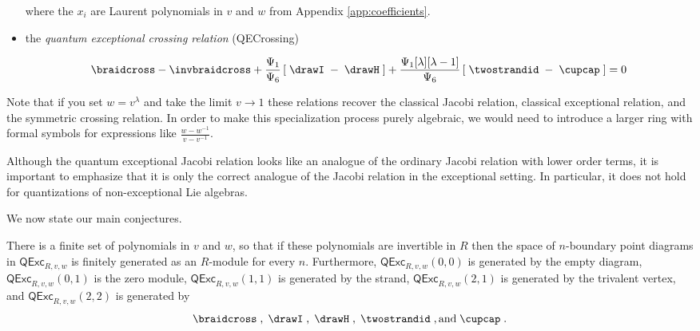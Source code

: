 \documentclass[12pt]{amsart}
\begin{document}
\begin{definition}
\begin{itemize}
where the $x_i$ are Laurent polynomials in $v$ and $w$ from Appendix \ref{app:coefficients}.

\item the \emph{quantum exceptional crossing relation} (QECrossing)

\begin{equation}
\label{eq:QECrossing-w}
\braidcross - \invbraidcross + \frac{\Psi_1}{\Psi_6} \left[\; \drawI \; - \; \drawH \; \right] + \frac{\Psi_1 [\lambda][\lambda-1]}{\Psi_6} \left[\; \twostrandid \; - \; \cupcap \; \right] = 0
\end{equation}


\end{itemize}
\end{definition}

Note that if you set $w = v^\lambda$ and take the limit $v \rightarrow 1$
these relations recover the classical Jacobi relation, classical exceptional
relation, and the symmetric crossing relation.  In order to make this
specialization process purely algebraic, we would need to introduce a larger
ring with formal symbols for expressions like $\frac{w-w^{-1}}{v-v^{-1}}$.

\begin{warning}
Although the quantum exceptional Jacobi relation looks like an
analogue of the ordinary Jacobi relation with lower order terms, it is
important to emphasize that it is only the correct analogue of the Jacobi
relation in the exceptional setting.  In particular, it does not hold for
quantizations of non-exceptional Lie algebras.
\end{warning}

We now state our main conjectures.

\begin{conjecture}
  \label{conj:quant-suffic}
There is a finite set of polynomials in $v$ and $w$, so that if these
polynomials are invertible in $R$ then the space of $n$-boundary point
diagrams in $\mathsf{QExc}_{R,v,w}$ is finitely generated as an $R$-module for
every $n$.  Furthermore, $\mathsf{QExc}_{R,v,w}(0,0)$ is generated by the
empty diagram, $\mathsf{QExc}_{R,v,w}(0,1)$ is the zero module,
$\mathsf{QExc}_{R,v,w}(1,1)$ is generated by the strand,
$\mathsf{QExc}_{R,v,w}(2,1)$ is generated by the trivalent vertex, and
$\mathsf{QExc}_{R,v,w}(2,2)$ is generated by
$$\braidcross\;, \; \drawI \;, \; \drawH \;, \; \twostrandid \;, \text{and} \; \cupcap \; .$$
\end{conjecture}
\end{document}
